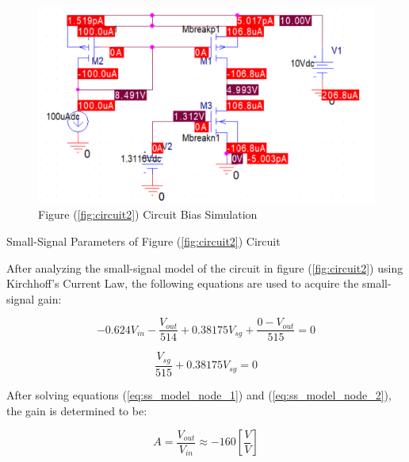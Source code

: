 \FloatBarrier

\begin{figure}[h!]
	\centering
	\includegraphics[scale=0.75]{../images/circuit2_bias_sim.PNG}
	\caption{Figure (\ref{fig:circuit2}) Circuit Bias Simulation}
	\label{fig:circuit2_bias_sim}
\end{figure}

\FloatBarrier

\FloatBarrier

\begin{table}[h!]
	\centering
	\caption{Small-Signal Parameters of Figure (\ref{fig:circuit2}) Circuit}
	\label{tab:ss_params}
\end{table}

\FloatBarrier

After analyzing the small-signal model of the circuit in figure (\ref{fig:circuit2}) using Kirchhoff's Current Law, the following equations are used to acquire the small-signal gain:

\begin{equation}
	\label{eq:ss_model_node_1}
	-0.624V_{in} - \frac{V_{out}}{514} + 0.38175V_{sg} + \frac{0 - V_{out}}{515} = 0
\end{equation}

\begin{equation}
	\label{eq:ss_model_node_2}
	\frac{V_{sg}}{515} + 0.38175V_{sg} = 0
\end{equation}

After solving equations (\ref{eq:ss_model_node_1}) and (\ref{eq:ss_model_node_2}), the gain is determined to be:

\begin{equation}
	\label{eq:gain}
	A = \frac{V_{out}}{V_{in}} \approx -160 [\frac{V}{V}]
\end{equation}


